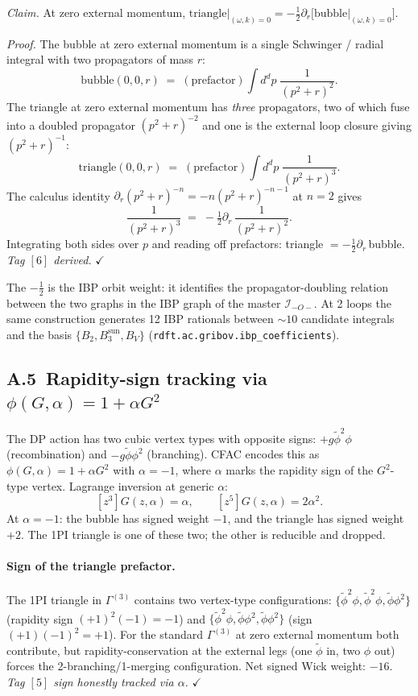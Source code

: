 \documentclass[11pt,a4paper]{article}
\newcommand{\ck}[1]{\textcolor{cntcol}{$[#1]$}}
\begin{document}
\textit{Claim.} At zero external momentum,
$\text{triangle}\bigl|_{(\omega,k)=0} = -\tfrac{1}{2}\partial_{r}\bigl[\text{bubble}\bigl|_{(\omega,k)=0}\bigr]$.

\textit{Proof.} The bubble at zero external momentum is a single Schwinger / radial
integral with two propagators of mass $r$:
\[
\text{bubble}(0,0,r) \;=\; (\text{prefactor})\!\int\!d^{d}p\;\frac{1}{(p^{2}+r)^{2}}.
\]
The triangle at zero external momentum has \emph{three} propagators, two of which fuse
into a doubled propagator $(p^{2}+r)^{-2}$ and one is the external loop closure giving
$(p^{2}+r)^{-1}$:
\[
\text{triangle}(0,0,r) \;=\; (\text{prefactor})\!\int\!d^{d}p\;\frac{1}{(p^{2}+r)^{3}}.
\]
The calculus identity $\partial_{r}(p^{2}+r)^{-n} = -n(p^{2}+r)^{-n-1}$ at $n = 2$ gives
\[
\frac{1}{(p^{2}+r)^{3}} \;=\; -\tfrac{1}{2}\partial_{r}\,\frac{1}{(p^{2}+r)^{2}}.
\]
Integrating both sides over $p$ and reading off prefactors: triangle $= -\tfrac{1}{2}\partial_{r}\,$bubble.
\emph{Tag \ck{6} derived.} $\checkmark$

The $-\tfrac{1}{2}$ is the IBP orbit weight: it identifies the propagator-doubling
relation between the two graphs in the IBP graph of the master $\mathcal I_{-O-}$.
At 2 loops the same construction generates 12 IBP rationals between $\sim 10$ candidate
integrals and the basis $\{B_{2}, B_{3}^{\text{sun}}, B_{V}\}$
(\texttt{rdft.ac.gribov.ibp\_coefficients}).

\subsection*{A.5\ Rapidity-sign tracking via $\phi(G,\alpha) = 1 + \alpha G^{2}$}

The DP action has two cubic vertex types with opposite signs:
$+g\widetilde\phi^{2}\phi$ (recombination) and $-g\widetilde\phi\phi^{2}$ (branching).
CFAC encodes this as $\phi(G,\alpha) = 1 + \alpha G^{2}$ with $\alpha = -1$, where
$\alpha$ marks the rapidity sign of the $G^{2}$-type vertex. Lagrange inversion at
generic $\alpha$:
\[
[z^{3}]G(z,\alpha) = \alpha,\qquad [z^{5}]G(z,\alpha) = 2\alpha^{2}.
\]
At $\alpha = -1$: the bubble has signed weight $-1$, and the triangle has signed weight
$+2$. The 1PI triangle is one of these two; the other is reducible and dropped.

\paragraph{Sign of the triangle prefactor.} The 1PI triangle in $\Gamma^{(3)}$ contains
two vertex-type configurations: $\{\widetilde\phi^{2}\phi, \widetilde\phi^{2}\phi, \widetilde\phi\phi^{2}\}$
(rapidity sign $(+1)^{2}(-1) = -1$) and $\{\widetilde\phi^{2}\phi, \widetilde\phi\phi^{2}, \widetilde\phi\phi^{2}\}$
(sign $(+1)(-1)^{2} = +1$). For the standard $\Gamma^{(3)}$ at zero external momentum
both contribute, but rapidity-conservation at the external legs (one $\widetilde\phi$ in,
two $\phi$ out) forces the 2-branching/1-merging configuration. Net signed Wick weight:
$-16$. \emph{Tag \ck{5} sign honestly tracked via $\alpha$.} $\checkmark$
\end{document}
